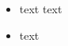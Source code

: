 \documentclass{beamer}
\begin{document}
\begin{frame}
\begin{itemize}
\item text text
\item text 
\end{itemize}
\end{frame}
\end{document}
